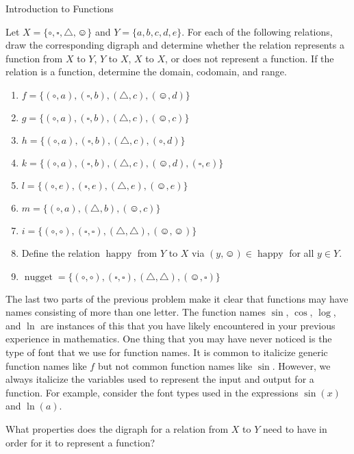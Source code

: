 \begin{section}{Introduction to Functions}
\begin{problem}\label{prob:lots of potential functions}
Let $X=\{\circ, \square,\triangle,\smiley\}$ and $Y=\{a,b,c,d,e\}$. For each of the following relations, draw the corresponding digraph and determine whether the relation represents a function from $X$ to $Y$, $Y$ to $X$, $X$ to $X$, or does not represent a function. If the relation is a function, determine the domain, codomain, and range.
\begin{enumerate}[label=\textrm{(\alph*)}]
\item $f=\{(\circ, a),(\square,b),(\triangle,c),(\smiley,d)\}$
\item $g=\{(\circ, a),(\square,b),(\triangle,c),(\smiley,c)\}$
\item $h=\{(\circ, a),(\square,b),(\triangle,c),(\circ,d)\}$
\item $k=\{(\circ, a),(\square,b),(\triangle,c),(\smiley,d),(\square,e)\}$
\item $l=\{(\circ, e),(\square,e),(\triangle,e),(\smiley,e)\}$
\item $m=\{(\circ, a),(\triangle,b),(\smiley,c)\}$
\item \label{prob:identity} $i=\{(\circ,\circ),(\square, \square),(\triangle,\triangle),(\smiley,\smiley)\}$
\item\label{prob:happy} Define the relation $\operatorname{happy}$ from $Y$ to $X$ via $(y,\smiley)\in\operatorname{happy}$ for all $y\in Y$.
\item\label{prob:nugget} $\operatorname{nugget}=\{(\circ,\circ),(\square, \square),(\triangle,\triangle),(\smiley,\square)\}$
\end{enumerate}
\end{problem}

The last two parts of the previous problem make it clear that functions may have names consisting of more than one letter.  The function names $\sin$, $\cos$, $\log$, and $\ln$ are instances of this that you have likely encountered in your previous experience in mathematics. One thing that you may have never noticed is the type of font that we use for function names. It is common to italicize generic function names like $f$ but not common function names like $\sin$.  However, we always italicize the variables used to represent the input and output for a function. For example, consider the font types used in the expressions $\sin(x)$ and $\ln(a)$.

\begin{problem}
What properties does the digraph for a relation from $X$ to $Y$ need to have in order for it to represent a function?
\end{problem}


\end{section}
